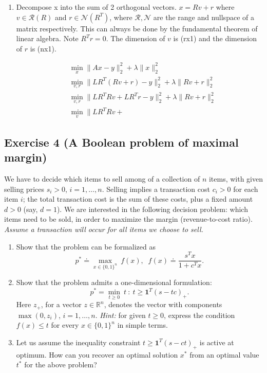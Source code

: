 \documentclass[11pt]{article}
\begin{document}
\begin{solution}
\begin{enumerate}
    \item Decompose x into the sum of 2 orthogonal vectors. $x = Rv + r$ where $v \in \mathcal{R}(R)$ and $r \in \mathcal{N}(R^T)$, where $\mathcal{R}, \mathcal{N}$ are the range and nullspace of a matrix respectively. This can always be done by the fundamental theorem of linear algebra. Note $R^T r = 0$. The dimension of $v$ is (rx1) and the dimension of $r$ is (nx1).

    \begin{align*}
        &\min_x \|Ax - y\|_2^2 + \lambda \|x\|_2^2 \\
        &\min_{v,r} \|L R^T (Rv + r) - y\|_2^2 + \lambda \|Rv + r\|_2^2 \\
        &\min_{v,r} \|L R^T R v + L R^T r - y\|_2^2 + \lambda \|Rv + r\|_2^2 \\
        &\min_{v} \|L R^T R v + 
    \end{align*}
\end{enumerate}
\end{solution}

\newpage
\subsection*{Exercise 4 (A Boolean problem of maximal margin)}

We have to decide which items to sell among of a collection of $n$ items, with given selling prices $s_i>0$, $i=1,\ldots,n$. Selling implies a transaction cost $c_i>0$ for each item $i$; the total transaction cost is the sum of these costs, plus a fixed amount $d>0$ (say, $d=1$). We are interested in the following decision problem: which items need to be sold, in order to maximize the margin (revenue-to-cost ratio). \textit{Assume a transaction will occur for all items we choose to sell.}

\begin{enumerate}
    \item Show that the problem can be formalized as
    \[
    p^* \doteq \max_{x \in \{0,1\}^n} \: f(x), \;\; f(x) \doteq \frac{s^T x}{1+c^T x} .
    \]

    \item Show that the problem admits a one-dimensional formulation:
    \[
    p^* = \min_{t \ge 0} \: t ~:~ t  \ge \mathbf{1}^T (s-tc)_+.
    \]
    Here $z_+$, for a vector $z \in \mathbb{R}^{n}$, denotes the vector with components $\max(0,z_i)$, $i=1,\ldots,n$. {\em Hint:} for given $t \ge 0$, express the condition $f(x) \le t$ for every $x \in \{0,1\}^n$ in simple terms.

    \item Let us assume the inequality constraint $t \ge \mathbf{1}^T (s-ct)_+$ is active at optimum. How can you recover an optimal solution $x^*$ from an optimal value $t^*$ for the above problem?
\end{enumerate}
\end{document}
